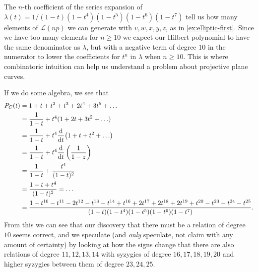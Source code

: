 \documentclass[10pt,notitlepage]{article}
\numberwithin{equation}{subsection}
\begin{document}
\begin{example}
            The $n$-th coefficient of the series expansion of $\lambda(t)=1/(1-t)(1-t^4)(1-t^5)(1-t^6)(1-t^7)$ tell us how many elements of $\mathcal{L}(np)$ we can generate with $v,w,x,y,z$, as in \cref{ex:elliptic-first}.
            Since we have too many elements for $n\geqslant10$ we expect our Hilbert polynomial to have the same denominator as $\lambda$, but with a negative term of degree $10$ in the numerator to lower the coefficients for $t^n$ in $\lambda$ when $n\geqslant10$.
            This is where combinatoric intuition can help us understand a problem about projective plane curves.

            If we do some algebra, we see that
            \begin{align*}
                P_C(t) & = 1+t+t^2+t^3+2t^4+3t^5+\ldots \\
                & = \frac{1}{1-t} + t^4(1+2t+3t^2+\ldots) \\
                & = \frac{1}{1-t} + t^4\dv{t}(1+t+t^2+\ldots) \\
                & = \frac{1}{1-t} + t^4\dv{t}\left(\frac{1}{1-z}\right) \\
                & = \frac{1}{1-t} + \frac{t^4}{(1-t)^2} \\
                & = \frac{1-t+t^4}{(1-t)^2}
                = \ldots \\
                &= \frac{1-t^{10}-t^{11}-2t^{12}-t^{13}-t^{14}+t^{16}+2 t^{17}+2 t^{18}+2 t^{19}+t^{20}-t^{23}-t^{24}-t^{25}}{(1-t)(1-t^4)(1-t^5)(1-t^6)(1-t^7)}.
            \end{align*}
            From this we can see that our discovery that there must be a relation of degree $10$ seems correct, and we speculate (and \emph{only} speculate, not claim with any amount of certainty) by looking at how the signs change that there are also relations of degree $11,12,13,14$ with syzygies of degree $16,17,18,19,20$ and higher syzygies between them of degree $23,24,25$.
        \end{example}






\end{document}
